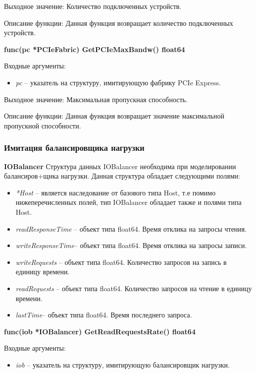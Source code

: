 Выходное значение: Количество подключенных устройств.

Описание функции: Данная функция возвращает количество подключенных устройств.


\textbf{func(pc *PCIeFabric) GetPCIeMaxBandw() float64}

Входные аргументы: 
\begin{itemize}
	\item \textit{pc} -- указатель на структуру, имитирующую фабрику PCIe Express.
\end{itemize}

Выходное значение: Максимальная пропускная способность.

Описание функции: Данная функция возвращает значение максимальной пропускной способности.

\subsubsection{Имитация балансировщика нагрузки}
\textbf{IOBalancer}
Структура данных IOBalancer необходима при моделировании балансиров+щика нагрузки. Данная структура обладает следующими полями:
\begin{itemize}
	
	\item \textit{	*Host} -- является наследование от базового типа Host, т.е помимо нижеперечисленных полей, тип IOBalancer обладает также и полями типа Host. 
	\item \textit{	readResponseTime} -- объект типа float64. Время отклика на запросы чтения.
	\item \textit{	writeResponseTime}-- объект типа float64. Время отклика на запросы записи.
	\item \textit{	writeRequests} -- объект типа float64. Количество запросов на запись в единицу времени.
	\item \textit{	readRequests} -- объект типа  float64. Количество запросов на чтение в единицу времени.
	\item \textit{	lastTime}-- объект типа float64. Время последнего запроса. 
\end{itemize}

\textbf{func(iob *IOBalancer) GetReadRequestsRate() float64}

Входные аргументы: 
\begin{itemize}
	\item \textit{iob} -- указатель на структуру, имитирующую балансировщик нагрузки. 
\end{itemize}

